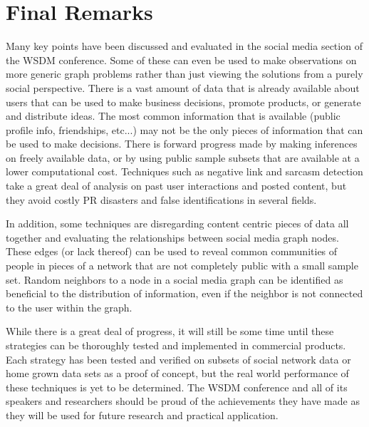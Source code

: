 \documentclass{sig-alternate}
\begin{document}
\section{Final Remarks}
\label{final remarks}
Many key points have been discussed and evaluated in the social media section of the WSDM conference. 
Some of these can even be used to make observations on more generic graph problems rather
than just viewing the solutions from a purely social perspective. There is a vast amount of data
that is already available about users that can be used to make business decisions, promote products,
or generate and distribute ideas. The most common information that is available (public profile info, friendships, etc...)
may not be the only pieces of information that can be used to make decisions. There is forward progress
made by making inferences on freely available data, or by using public sample subsets that are
available at a lower computational cost. Techniques such as negative link and sarcasm detection take a great deal
of analysis on past user interactions and posted content, but they avoid costly PR disasters and false
identifications in several fields.

In addition, some techniques are disregarding content centric pieces of data all together and evaluating
the relationships between social media graph nodes. These edges (or lack thereof) can be used to reveal
common communities of people in pieces of a network that are not completely public with a small sample
set. Random neighbors to a node in a social media graph can be identified as beneficial to the distribution
of information, even if the neighbor is not connected to the user within the graph. 

While there is a great deal of progress, it will still be some time until these strategies can be 
thoroughly tested and implemented in commercial products. Each strategy has been tested and 
verified on subsets of social network data or home grown data sets as a proof of concept, but
the real world performance of these techniques is yet to be determined. The WSDM conference and
all of its speakers and researchers should be proud of the achievements they have made as they will
be used for future research and practical application. 



\balance
\end{document}
